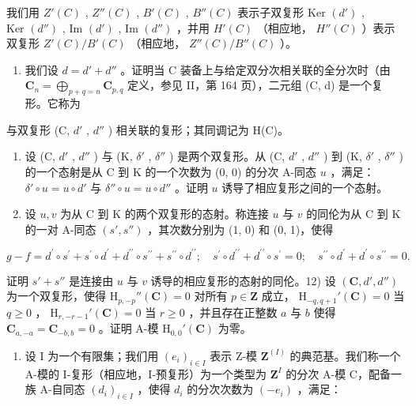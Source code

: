 我们用 \(Z'(C)\) , \(Z''(C)\) , \(B'(C)\) , \(B''(C)\) 表示子双复形 \(\text{Ker } (d')\) , \(\text{Ker } (d'')\) , \(\text{Im } (d')\) , \(\text{Im } (d'')\) ，并用 \(H'(C)\) （相应地， \(H''(C)\) ）表示双复形 \(Z'(C)/B'(C)\) （相应地， \(Z''(C)/B''(C)\) ）。

\begin{enumerate}
\def\labelenumi{\alph{enumi})}
\tightlist
\item
  我们设 \(d = d' + d''\) 。证明当 C 装备上与给定双分次相关联的全分次时（由 \(\mathbf{C}_n = \bigoplus_{p+q=n} \mathbf{C}_{p,q}\) 定义，参见 II，第 164 页），二元组 (C, d) 是一个复形。它称为
\end{enumerate}

与双复形 (C, \(d'\) , \(d''\) ) 相关联的复形；其同调记为 H(C)。

\begin{enumerate}
\def\labelenumi{\alph{enumi})}
\setcounter{enumi}{1}
\item
  设 (C, \(d'\) , \(d''\) ) 与 (K, \(\delta'\) , \(\delta''\) ) 是两个双复形。从 (C, \(d'\) , \(d''\) ) 到 (K, \(\delta'\) , \(\delta''\) ) 的一个态射是从 C 到 K 的一个次数为 (0, 0) 的分次 A-同态 \(u\) ，满足： \(\delta'\circ u = u \circ d'\) 与 \(\delta''\circ u = u \circ d''\) 。证明 \(u\) 诱导了相应复形之间的一个态射。
\item
  设 \(u, v\) 为从 C 到 K 的两个双复形的态射。称连接 \(u\) 与 \(v\) 的同伦为从 C 到 K 的一对 A-同态 \((s', s'')\) ，其次数分别为 (1, 0) 和 (0, 1)，使得
\end{enumerate}

\[
g - f = d ^ {\prime} \circ s ^ {\prime} + s ^ {\prime} \circ d ^ {\prime} + d ^ {\prime \prime} \circ s ^ {\prime \prime} + s ^ {\prime \prime} \circ d ^ {\prime \prime}; \quad s ^ {\prime} \circ d ^ {\prime \prime} + d ^ {\prime \prime} \circ s ^ {\prime} = 0; \quad s ^ {\prime \prime} \circ d ^ {\prime} + d ^ {\prime} \circ s ^ {\prime \prime} = 0.
\]

证明 \(s' + s''\) 是连接由 \(u\) 与 \(v\) 诱导的相应复形的态射的同伦。12) 设 \((\mathbf{C}, d', d'')\) 为一个双复形，使得 \(\mathrm{H}_{p,-p}''(\mathbf{C}) = 0\) 对所有 \(p \in \mathbf{Z}\) 成立， \(\mathrm{H}_{-q,q+1}'(\mathbf{C}) = 0\) 当 \(q \geqslant 0\) ， \(\mathrm{H}_{r,-r-1}'(\mathbf{C}) = 0\) 当 \(r \geqslant 0\) ，并且存在正整数 \(a\) 与 \(b\) 使得 \(\mathbf{C}_{a,-a} = \mathbf{C}_{-b,b} = 0\) 。证明 A-模 \(\mathrm{H}_{0,0}'(\mathbf{C})\) 为零。

\begin{enumerate}
\def\labelenumi{\arabic{enumi})}
\setcounter{enumi}{12}
\tightlist
\item
  设 I 为一个有限集；我们用 \((e_i)_{i\in I}\) 表示 Z-模 \(\mathbf{Z}^{(I)}\) 的典范基。我们称一个 A-模的 I-复形（相应地，I-预复形）为一个类型为 \(\mathbf{Z}^{I}\) 的分次 A-模 C，配备一族 A-自同态 \((d_i)_{i\in I}\) ，使得 \(d_i\) 的分次次数为 \((-e_i)\) ，满足：
\end{enumerate}

